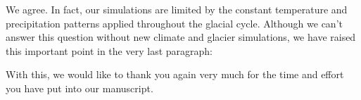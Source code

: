     We agree. In fact, our simulations are limited by the constant temperature
    and precipitation patterns applied throughout the glacial cycle. Although
    we can't answer this question without new climate and glacier simulations,
    we have raised this important point in the very last paragraph:


    With this, we would like to thank you again very much for the time and
    effort you have put into our manuscript.







